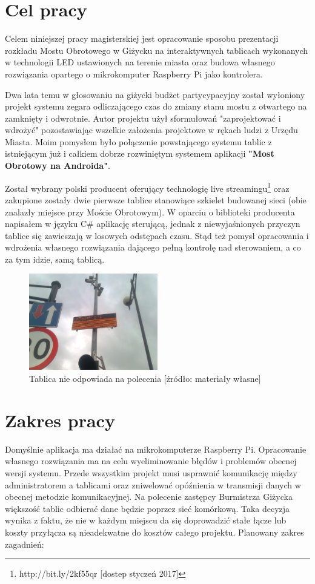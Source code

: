\documentclass[wmii,inf,mgr]{uwmthesis}
\begin{document}
\section{Cel pracy}
	Celem niniejszej pracy magisterskiej jest opracowanie sposobu prezentacji rozkładu Mostu Obrotowego w Giżycku na interaktywnych tablicach wykonanych w technologii LED ustawionych na terenie miasta oraz budowa własnego rozwiązania opartego o mikrokomputer Raspberry Pi jako kontrolera.\par
	Dwa lata temu w głosowaniu na giżycki budżet partycypacyjny został wyłoniony projekt systemu zegara odliczającego czas do zmiany stanu mostu z otwartego na zamknięty i odwrotnie. Autor projektu użył sformułowań "zaprojektować i wdrożyć" pozostawiając wszelkie założenia projektowe w rękach ludzi z Urzędu Miasta. Moim pomysłem było połączenie powstającego systemu tablic z istniejącym już i całkiem dobrze rozwiniętym systemem aplikacji \textbf{"Most Obrotowy na Androida"}. \par
	Został wybrany polski producent oferujący technologię live streamingu\footnote{http://bit.ly/2kf55qr [dostep styczeń 2017]} oraz zakupione zostały dwie pierwsze tablice stanowiące szkielet budowanej sieci (obie znalazły miejsce przy Moście Obrotowym). W oparciu o biblioteki producenta napisałem w języku C\# aplikację sterującą, jednak z niewyjaśnionych przyczyn tablice się zawieszają w losowych odstępach czasu. Stąd też pomysł opracowania i wdrożenia własnego rozwiązania dającego pełną kontrolę nad sterowaniem, a co za tym idzie, samą tablicą.
\begin{figure}[h]
\centering
\includegraphics[width=0.5\textwidth]{obraz2}
\caption{Tablica nie odpowiada na polecenia [źródło: materiały własne]}
\end{figure}

\section{Zakres pracy}
	Domyślnie aplikacja ma działać na mikrokomputerze Raspberry Pi. Opracowanie własnego rozwiązania ma na celu wyeliminowanie błędów i problemów obecnej wersji systemu. Przede wszystkim projekt musi usprawnić komunikację między administratorem a tablicami oraz zniwelować opóźnienia w transmisji danych w obecnej metodzie komunikacyjnej. Na polecenie zastępcy Burmistrza Giżycka większość tablic odbierać dane będzie poprzez sieć komórkową. Taka decyzja wynika z faktu, że nie w każdym miejscu da się doprowadzić stałe łącze lub koszty przyłącza są nieadekwatne do kosztów całego projektu. \newpage 
	Planowany zakres zagadnień:
	
\end{document}
